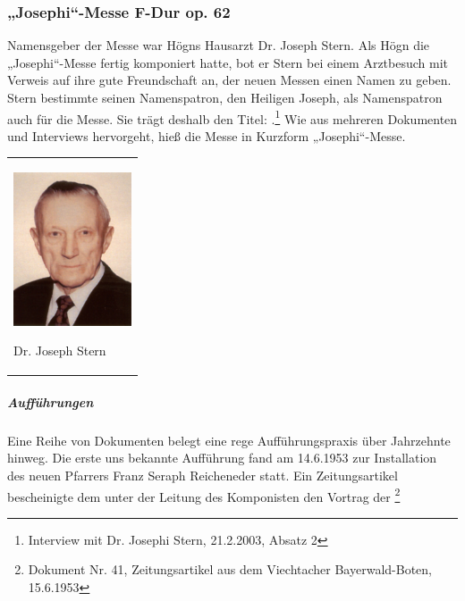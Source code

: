 \subsubsection[„Josephi“{}-Messe F{}-Dur op. 62]{„Josephi“-Messe F-Dur
op. 62}


Namensgeber der Messe war Högns Hausarzt Dr. Joseph Stern. Als Högn die
„Josephi“-Messe fertig komponiert hatte, bot er Stern bei einem
Arztbesuch mit Verweis auf ihre gute Freundschaft an, der neuen Messen
einen Namen zu geben. Stern bestimmte seinen Namenspatron, den Heiligen
Joseph, als Namenspatron auch für die Messe. Sie trägt deshalb den
Titel: .\footnote{
Interview mit Dr. Josephi Stern, 21.2.2003, Absatz 2} Wie aus mehreren
Dokumenten und Interviews hervorgeht, hieß die Messe in Kurzform
„Josephi“-Messe.

\begin{center}
\begin{minipage}{3.884cm}
\begin{flushleft}
\tablefirsthead{}
\tablehead{}
\tabletail{}
\tablelasttail{}
\begin{supertabular}{m{3.684cm}}

\includegraphics[width=3.501cm,height=4.533cm]{pictures/zulassungsarbeit-img106.jpg}

Dr. Joseph Stern\\
\end{supertabular}
\end{flushleft}
\end{minipage}
\end{center}


\begin{figure}
\img{}
\caption{}
\end{figure}

\subparagraph{Aufführungen}
Eine Reihe von Dokumenten belegt eine rege Aufführungspraxis über
Jahrzehnte hinweg. Die erste uns bekannte Aufführung fand am 14.6.1953
zur Installation des neuen Pfarrers Franz Seraph Reicheneder statt. Ein
Zeitungsartikel bescheinigte dem 
unter der Leitung des Komponisten den 
Vortrag der  \footnote{Dokument
Nr. 41, Zeitungsartikel aus dem Viechtacher Bayerwald-Boten, 15.6.1953}

